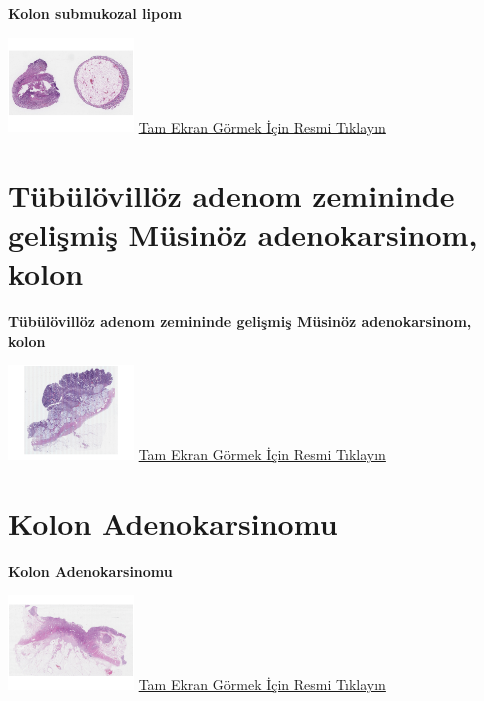 \documentclass[
  letterpaper,
  DIV=11,
  numbers=noendperiod]{scrreprt}
\begin{document}
\textbf{Kolon submukozal lipom}

\href{https://images.patolojiatlasi.com/colon-submucosal-lipoma/HE.html}{\includegraphics[width=0.25\textwidth,height=\textheight]{./screenshots/colon-submucosal-lipoma_screenshot.png}}
\href{https://images.patolojiatlasi.com/colon-submucosal-lipoma/HE.html}{Tam
Ekran Görmek İçin Resmi Tıklayın}

\hypertarget{sec-tubulovilloz-adenom-zemininde-adenokarsinom}{%
\chapter{Tübülövillöz adenom zemininde gelişmiş Müsinöz adenokarsinom,
kolon}\label{sec-tubulovilloz-adenom-zemininde-adenokarsinom}}

\textbf{Tübülövillöz adenom zemininde gelişmiş Müsinöz adenokarsinom,
kolon}

\href{https://images.patolojiatlasi.com/mucinous-adenocarcinoma-colon/HE.html}{\includegraphics[width=0.25\textwidth,height=\textheight]{./screenshots/mucinous-adenocarcinoma-colon_screenshot.png}}
\href{https://images.patolojiatlasi.com/mucinous-adenocarcinoma-colon/HE.html}{Tam
Ekran Görmek İçin Resmi Tıklayın}

\hypertarget{sec-kolon-adenokarsinomu}{%
\chapter{Kolon Adenokarsinomu}\label{sec-kolon-adenokarsinomu}}

\textbf{Kolon Adenokarsinomu}

\href{https://images.patolojiatlasi.com/colon-adenocarcinoma/HE.html}{\includegraphics[width=0.25\textwidth,height=\textheight]{./screenshots/colon-adenocarcinoma-1_screenshot.png}}
\href{https://images.patolojiatlasi.com/colon-adenocarcinoma/HE.html}{Tam
Ekran Görmek İçin Resmi Tıklayın}
\end{document}
